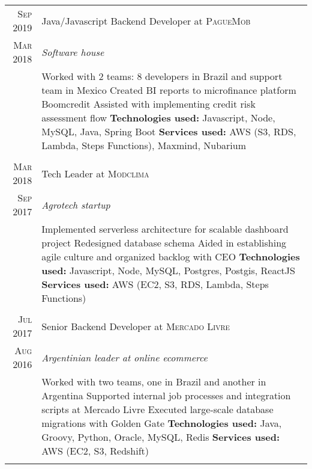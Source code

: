 \documentclass[a4paper,10pt]{article}
\begin{document}
\begin{tabular}{r|p{11cm}}
 \textsc{ Sep 2019 } & Java/Javascript Backend Developer at \textsc{PagueMob} \\\textsc{Mar 2018}&\emph{Software house }\\&\footnotesize{
  Worked with 2 teams: 8 developers in Brazil and support team in Mexico \newline
  Created BI reports to microfinance platform Boomcredit \newline
  Assisted with implementing credit risk assessment flow \newline
\textbf{Technologies used:} Javascript, Node, MySQL, Java, Spring Boot\newline
\textbf{Services used:} AWS (S3, RDS, Lambda, Steps Functions), Maxmind, Nubarium }\\\multicolumn{2}{c}{} \\

 \textsc{ Mar 2018 } & Tech Leader at \textsc{Modclima} \\\textsc{Sep 2017}&\emph{Agrotech startup }\\&\footnotesize{
  Implemented serverless architecture for scalable dashboard project\newline
  Redesigned database schema\newline
  Aided in establishing agile culture and organized backlog with CEO\newline
\textbf{Technologies used:} Javascript, Node, MySQL, Postgres, Postgis, ReactJS\newline
\textbf{Services used:} AWS (EC2, S3, RDS, Lambda, Steps Functions)}\\\multicolumn{2}{c}{} \\

 \textsc{Jul 2017} & Senior Backend Developer at \textsc{Mercado Livre} \\\textsc{Aug 2016}&\emph{Argentinian leader at online ecommerce }\\&\footnotesize{
  Worked with two teams, one in Brazil and another in Argentina\newline
  Supported internal job processes and integration scripts at Mercado Livre\newline
  Executed large-scale database migrations with Golden Gate\newline
\textbf{Technologies used:} Java, Groovy, Python, Oracle, MySQL, Redis\newline
\textbf{Services used:} AWS (EC2, S3, Redshift)}\\\multicolumn{2}{c}{} \\
 
 \end{tabular}
 
\end{document}
